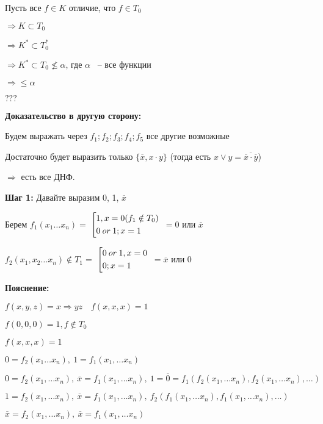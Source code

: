 \documentclass[russian]{lecture-notes}
\begin{document}
	Пусть все $f \in K$ отличие, что
	$f \in T_0$

	$ \Rightarrow K \subset T_0$ 

	$\Rightarrow K^* \subset T^*_0$ 

	$\Rightarrow K^* \subset T_0 \nleq \alpha$, где $\alpha$ ~-- все функции
	
	$\Rightarrow \leq \alpha$
	
	$???$	

	\textbf{Доказательство в другую сторону:}
	
	Будем выражать через $f_1; f_2; f_3; f_4; f_5$ все другие возможные
	
	Достаточно будет выразить только $\{ \overline{x}, x \cdot y\}$ (тогда есть $x \lor y = \overline{\overline{x} \cdot \overline{y}}$)
	
	$\Rightarrow$ есть все ДНФ.
	
	\textbf{Шаг 1:}
	Давайте выразим 0, 1, $\overline{x}$
	
	Берем $f_1(x_1 \dots x_n) = $
	$\left[ 
  		\begin{gathered} 
    			1, x = 0 (f_1 \notin T_0) \hfill 
        \\ 
        		0 \: or \: 1; x = 1 \hfill 
        \\ 
	  	\end{gathered} 
	\right.$
	$ = 0$ или $\overline{x}$
	
	$f_2(x_1, x_2 \dots x_n) \notin T_1 = $
	$\left[ 
  		\begin{gathered} 
    			0 \: or \: 1, x = 0 \hfill 
        \\ 
        		0; x = 1 \hfill 
        \\ 
	  	\end{gathered} 
	\right.$
	$ = \overline{x}$ или $0$
	
	\textbf{Пояснение:}
	
	$f(x, y, z) = x \Rightarrow yz \quad f(x, x, x) = 1$
	
	$f(0, 0, 0) = 1, f \notin T_0$
	
	$f(x, x, x) = 1$
	
	$0 = f_2(x_1 \dots x_n), \: 1 = 	f_1(x_1, \dots x_n)$
	
	$0 = f_2(x_1, \dots x_n), \: \overline{x} = f_1(x_1, \dots x_n), \: 1 = \overline{0} = f_1(f_2(x_1, \dots x_n), f_2(x_1, \dots x_n), \dots) $
	
	$1 = f_2(x_1, \dots x_n), \: \overline{x} = f_1(x_1, \dots x_n), \: f_2(f_1(x_1, \dots x_n), f_1(x_1, \dots x_n), \dots)$
	
	$\overline{x} = f_2(x_1, \dots x_n), \: \overline{x} = f_1(x_1, \dots x_n)$
	
\end{document}
